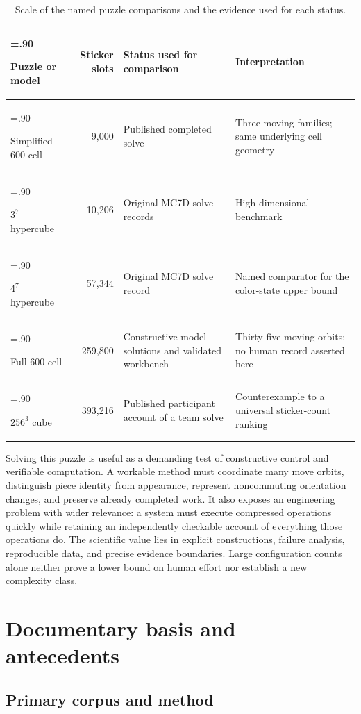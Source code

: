\documentclass[a4paper,11pt]{article}
\begin{document}
\begin{table}[htbp]
\centering
\small
\caption{Scale of the named puzzle comparisons and the evidence used for each status.}
\label{tab:comparisons}
\begin{tabularx}{\linewidth}{@{}>{\hsize=.90\hsize\raggedright\arraybackslash}Xr>{\hsize=1.05\hsize\raggedright\arraybackslash}X>{\hsize=1.05\hsize\raggedright\arraybackslash}X@{}}
\toprule
\textbf{Puzzle or model} & \textbf{Sticker slots} & \textbf{Status used for comparison} & \textbf{Interpretation} \\
\midrule
Simplified 600-cell & 9,000 & Published completed solve & Three moving families; same underlying cell geometry \\
\(3^{7}\) hypercube & 10,206 & Original MC7D solve records & High-dimensional benchmark \\
\(4^{7}\) hypercube & 57,344 & Original MC7D solve record & Named comparator for the color-state upper bound \\
Full 600-cell & 259,800 & Constructive model solutions and validated workbench & Thirty-five moving orbits; no human record asserted here \\
\(256^{3}\) cube & 393,216 & Published participant account of a team solve & Counterexample to a universal sticker-count ranking \\
\bottomrule
\end{tabularx}
\end{table}

Solving this puzzle is useful as a demanding test of constructive control and verifiable computation. A workable method must coordinate many move orbits, distinguish piece identity from appearance, represent noncommuting orientation changes, and preserve already completed work. It also exposes an engineering problem with wider relevance: a system must execute compressed operations quickly while retaining an independently checkable account of everything those operations do. The scientific value lies in explicit constructions, failure analysis, reproducible data, and precise evidence boundaries. Large configuration counts alone neither prove a lower bound on human effort nor establish a new complexity class.

\section{Documentary basis and antecedents}
\label{sec:2}

\subsection{Primary corpus and method}
\end{document}
